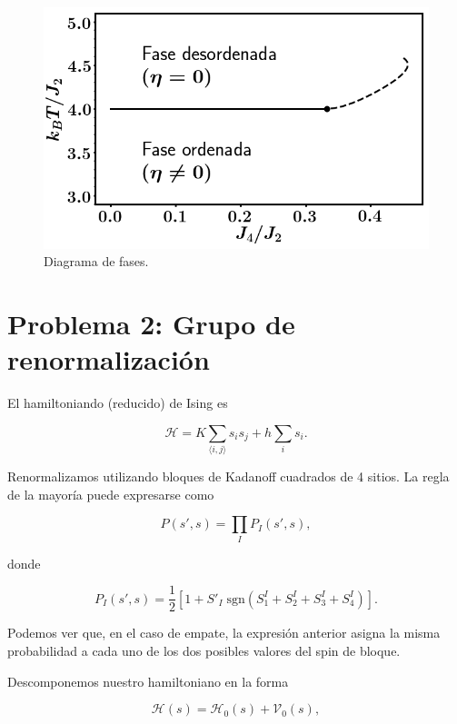 \documentclass[10pt]{article}
\begin{document}
\begin{figure}
\centering
\includegraphics[scale=0.5]{phase_diagram.png}
\caption{\label{fig:fases} Diagrama de fases.}
\end{figure}


\section*{Problema 2: Grupo de renormalizaci\'on}

El hamiltoniando (reducido) de Ising es

\begin{equation}
\mathcal{H} = K \sum_{\langle i, j\rangle} s_i s_j + h \sum_i s_i.
\end{equation}

Renormalizamos utilizando bloques de Kadanoff cuadrados de 4 sitios. La regla de la mayor\'ia puede expresarse como

\begin{equation}
P(s', s) = \prod_I P_I(s',s),
\end{equation}

donde 

\begin{equation}
P_I(s', s) = \dfrac{1}{2} \left[ 1 + S'_I\; \mathrm{sgn}(S_1^I+S_2^I+S_3^I+S_4^I) \right].
\end{equation}

Podemos ver que, en el caso de empate, la expresi\'on anterior asigna la misma probabilidad a cada uno de los dos posibles valores del spin de bloque.

Descomponemos nuestro hamiltoniano en la forma

\begin{equation}
\mathcal{H}(s) = \mathcal{H}_0(s) + \mathcal{V}_0(s),
\end{equation}
\end{document}
